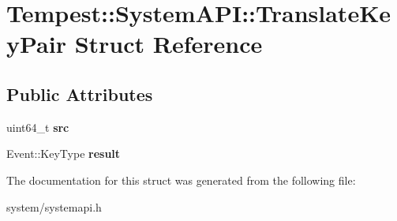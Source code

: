\hypertarget{struct_tempest_1_1_system_a_p_i_1_1_translate_key_pair}{\section{Tempest\+:\+:System\+A\+P\+I\+:\+:Translate\+Key\+Pair Struct Reference}
\label{struct_tempest_1_1_system_a_p_i_1_1_translate_key_pair}
}
\subsection*{Public Attributes}
\begin{DoxyCompactItemize}
\item 
\hypertarget{struct_tempest_1_1_system_a_p_i_1_1_translate_key_pair_a778f3ee332d8f61ebafe5f92feaf18f6}{uint64\+\_\+t {\bfseries src}}\label{struct_tempest_1_1_system_a_p_i_1_1_translate_key_pair_a778f3ee332d8f61ebafe5f92feaf18f6}

\item 
\hypertarget{struct_tempest_1_1_system_a_p_i_1_1_translate_key_pair_a8fe137a689696aeb13ef5a0fdc2541c1}{Event\+::\+Key\+Type {\bfseries result}}\label{struct_tempest_1_1_system_a_p_i_1_1_translate_key_pair_a8fe137a689696aeb13ef5a0fdc2541c1}

\end{DoxyCompactItemize}


The documentation for this struct was generated from the following file\+:\begin{DoxyCompactItemize}
\item 
system/systemapi.\+h\end{DoxyCompactItemize}
